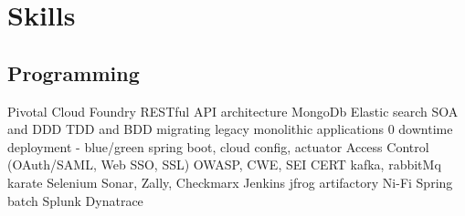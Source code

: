 \documentclass[]{deedy-resume-openfont}
\begin{document}
%
%
\lastupdated

%
%

%
%

\begin{minipage}[t]{0.33\textwidth} 



\section{Skills}
\subsection{Programming}

 \textbullet{} Pivotal Cloud Foundry \newline 
 \textbullet{} RESTful API architecture \newline
  \textbullet{} MongoDb \textbullet{} Elastic search \newline
 \textbullet{} SOA and DDD \newline 
 \textbullet{} TDD and BDD \newline 
 \textbullet{} migrating legacy monolithic applications \newline
 \textbullet{} 0 downtime deployment - blue/green \newline
 \textbullet{} spring boot, cloud config, actuator \newline 
 \textbullet{} Access Control (OAuth/SAML, Web SSO, SSL) \newline 
 \textbullet{} OWASP, CWE, SEI CERT \newline
 \textbullet{} kafka, rabbitMq \newline
 \textbullet{} karate \textbullet Selenium \newline
 \textbullet{} Sonar, Zally, Checkmarx \newline
 \textbullet{} Jenkins \textbullet{} jfrog artifactory \newline
 \textbullet{} Ni-Fi \textbullet{} Spring batch \newline
 \textbullet{} Splunk \textbullet{} Dynatrace
\sectionsep


\end{minipage}
\end{document}
